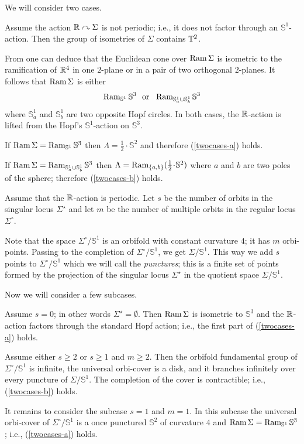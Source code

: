 \documentclass[oneside,a4paper]{article}
\def\Ram{\mathop{\rm Ram}\nolimits}
\def\SS{\mathbb{S}}
\begin{document}
We will consider two cases.

 Assume the action $\mathbb{R}\curvearrowright\Sigma$ is not periodic;
i.e., it does not factor through an $\SS^1$-action.
Then the group of isometries of $\Sigma$ contains $\mathbb{T}^2$.


From \cite[Proposition 3.9]{panov} one can deduce that the Euclidean
cone over $\Ram\Sigma$ is isometric to the ramification of $\mathbb{R}^4$
in one $2$-plane or in a pair of two orthogonal $2$-planes.
It follows that $\Ram \Sigma$ is either
$$\Ram_{\SS^1}\SS^3 \ \ \mathrm{or}\ \ \Ram_{\SS_a^1\cup \SS_b^1}\SS^3$$
where $\SS_a^1$ and $\SS_b^1$ are two opposite Hopf circles.
In both cases, the $\mathbb{R}$-action is lifted from the Hopf's $\SS^1$-action on $\SS^3$.

If $\Ram \Sigma=\Ram_{\SS^1}\SS^3$ then
$\Lambda=\tfrac12\cdot\SS^2$ and therefore (\ref{twocases-a}) holds.

If $\Ram \Sigma=\Ram_{\SS_a^1\cup \SS_b^1}\SS^3$ then  $\Lambda=\Ram_{\{a,b\}}(\tfrac12\cdot\SS^2)$ where $a$ and $b$ are two poles of the sphere;
therefore (\ref{twocases-b}) holds.

 Assume that the $\mathbb{R}$-action is periodic.
Let $s$ be the number of orbits in the singular locus $\Sigma^{{\star}}$
and let $m$ be the number of multiple orbits in the regular locus $\Sigma^\circ$.

Note that the space $\Sigma^\circ/\SS^1$ is an orbifold with constant curvature $4$;
it has $m$ orbi-points.
Passing to the completion of $\Sigma^\circ/\SS^1$, we get $\Sigma/\SS^1$.
This way we add $s$ points to $\Sigma^\circ/\SS^1$
which we will call the \emph{punctures};
this is a finite set of points formed by the projection of the singular locus $\Sigma^{{\star}}$
in the quotient space $\Sigma/\SS^1$.

Now we will consider a few subcases.

Assume $s=0$; in other words $\Sigma^{{\star}}=\emptyset$.
Then $\Ram\Sigma$ is isometric to $\SS^3$
and the $\mathbb{R}$-action factors through the standard Hopf action;
i.e., the first part of (\ref{twocases-a}) holds.

Assume either $s\ge 2$ or $s\ge 1$ and $m\ge 2$.
Then the orbifold fundamental group of $\Sigma^\circ/\SS^1$ is infinite, the universal orbi-cover is a disk, and it branches
infinitely over every puncture of $\Sigma/\SS^1$.
The completion of the cover is contractible; i.e., (\ref{twocases-b}) holds.

It remains to consider the subcase $s=1$ and $m=1$.
In this subcase the universal orbi-cover of $\Sigma^\circ/\SS^1$ is a once
punctured $\SS^2$ of curvature $4$ and $\Ram \Sigma=\Ram_{\SS^1}\SS^3$; i.e., (\ref{twocases-a}) holds.
\qeds
\end{document}
